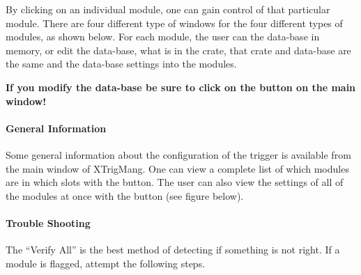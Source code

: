 
		
	By clicking on an individual module,  one can gain control of that particular module.  There are four different type of windows for the four different types of modules,  as shown below. For each module,  the user can  the data-base in memory,   or edit the data-base,   what is in the crate,   that crate and data-base are the same and  the data-base settings into the modules.

		
	{\bf If you modify the data-base be sure to click on the  button on the main window!}

 
\paragraph{ General Information}

	 Some general information about the configuration of the trigger is available from the main window of XTrigMang.  One can view a complete list of which modules are in which slots with the  button. The user can also view the settings of all of the modules at once with the  button (see figure below).
	


\paragraph{ Trouble Shooting }

	The ``Verify All'' is the best method of detecting if something is not right.  If a module is flagged, attempt the following steps.  

